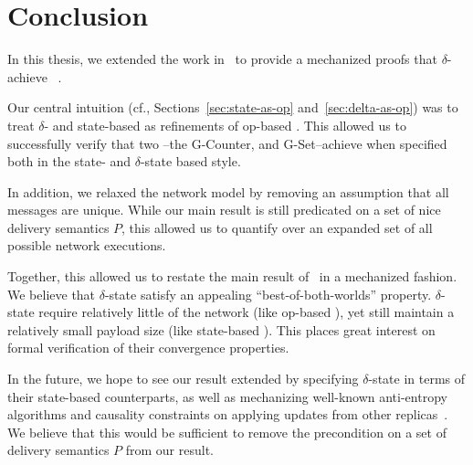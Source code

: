\chapter{Conclusion}
\label{chap:conclusion}

In this thesis, we extended the work in~\citet{gomes17} to provide a mechanized
proofs that $\delta$-\CRDTs~\citep{almedia18} achieve \SEC~\citep{shapiro11}.

Our central intuition (cf., Sections~\ref{sec:state-as-op}
and~\ref{sec:delta-as-op}) was to treat $\delta$- and state-based \CRDTs as
refinements of op-based \CRDTs.  This allowed us to successfully verify that two
\CRDTs--the G-Counter, and G-Set--achieve \SEC when specified both in the state-
and $\delta$-state based style.

In addition, we relaxed the network model by removing an assumption that all
messages are unique. While our main result is still predicated on a set of nice
delivery semantics $P$, this allowed us to quantify over an expanded set of all
possible network executions.

Together, this allowed us to restate the main result of~\citet{almedia18} in a
mechanized fashion. We believe that $\delta$-state \CRDTs satisfy an appealing
``best-of-both-worlds'' property. $\delta$-state \CRDTs require relatively
little of the network (like op-based \CRDTs), yet still maintain a relatively
small payload size (like state-based \CRDTs). This places great interest on
formal verification of their convergence properties.

In the future, we hope to see our result extended by specifying $\delta$-state
\CRDTs in terms of their state-based counterparts, as well as mechanizing
well-known anti-entropy algorithms and causality constraints on applying updates
from other replicas~\citep{almedia18}. We believe that this would be sufficient
to remove the precondition on a set of delivery semantics $P$ from our result.
